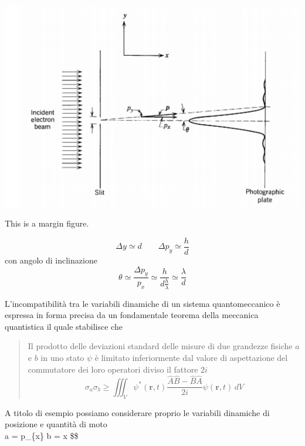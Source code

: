 \begin{marginfigure}
	\includegraphics[width = 1.3 \textwidth, height = 1.3 \textheight]{figs/beam-electron-experiment}
	\caption{This is a margin figure.}
	\label{fig:beam-electron-experiment}
\end{marginfigure}

\[
	\Delta y \simeq d \qquad \Delta p_{y} \simeq \frac{h}{d}
\] con angolo di inclinazione
\[
	\theta \simeq \frac{\Delta p_{y}}{p_{x}} \simeq \frac{h}{d \frac{h}{\lambda}} \simeq \frac{\lambda}{d}
\]

L'incompatibilità tra le variabili dinamiche di un sistema
quantomeccanico è espressa in forma precisa da un fondamentale teorema
della meccanica quantistica il quale stabilisce che

\begin{quote}
	Il prodotto delle deviazioni standard delle misure di due grandezze
	fisiche \(a\) e \(b\) in uno stato \(\psi\) è limitato inferiormente dal
	valore di aspettazione del commutatore dei loro operatori diviso il
	fattore \(2i\)
	\begin{equation}
		\sigma_{a} \sigma_{b} \geq \iiint_{V} \psi^{*}(\bm{r},t) \frac{\hat{A}\hat{B} -\hat{B}\hat{A}}{2i} \psi(\bm{r},t) \, dV
	\end{equation}
\end{quote}

A titolo di esempio possiamo considerare proprio le variabili dinamiche
di posizione e quantità di moto\[
\] a = p\_\{x\} \qquad b = x \$\$

